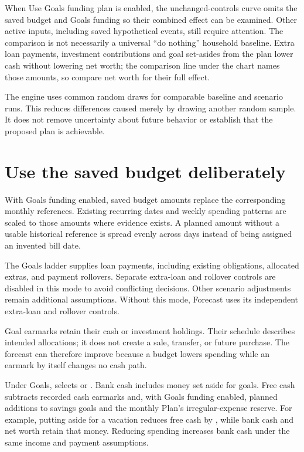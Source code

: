 When Use Goals funding plan is enabled, the unchanged-controls curve omits the saved budget and Goals funding so their combined effect can be examined. Other active inputs, including saved hypothetical events, still require attention. The comparison is not necessarily a universal ``do nothing'' household baseline. Extra loan payments, investment contributions and goal set-asides from the plan lower cash without lowering net worth; the comparison line under the chart names those amounts, so compare net worth for their full effect.

The engine uses common random draws for comparable baseline and scenario runs. This reduces differences caused merely by drawing another random sample. It does not remove uncertainty about future behavior or establish that the proposed plan is achievable.

\section{Use the saved budget deliberately}
With Goals funding enabled, saved budget amounts replace the corresponding monthly references. Existing recurring dates and weekly spending patterns are scaled to those amounts where evidence exists. A planned amount without a usable historical reference is spread evenly across days instead of being assigned an invented bill date.

The Goals ladder supplies loan payments, including existing obligations, allocated extras, and payment rollovers. Separate extra-loan and rollover controls are disabled in this mode to avoid conflicting decisions. Other scenario adjustments remain additional assumptions. Without this mode, Forecast uses its independent extra-loan and rollover controls.

Goal earmarks retain their cash or investment holdings. Their schedule describes intended allocations; it does not create a sale, transfer, or future purchase. The forecast can therefore improve because a budget lowers spending while an earmark by itself changes no cash path.

Under Goals,  selects  or . Bank cash includes money set aside for goals. Free cash subtracts recorded cash earmarks and, with Goals funding enabled, planned additions to savings goals and the monthly Plan's irregular-expense reserve. For example, putting  aside for a vacation reduces free cash by , while bank cash and net worth retain that money. Reducing spending increases bank cash under the same income and payment assumptions.


